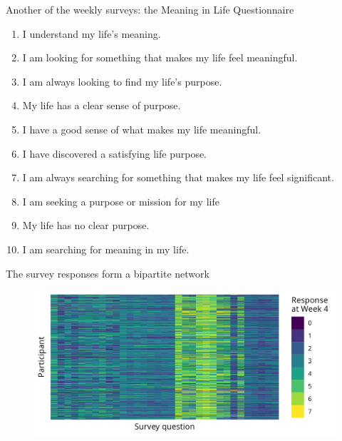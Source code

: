 \documentclass[aspectratio=169]{beamer}
\theoremstyle{remark}
\begin{document}
\begin{frame}{Another of the weekly surveys: the Meaning in Life Questionnaire}

    \begin{enumerate}
        \item I understand my life's meaning.
        \item I am looking for something that makes my life feel meaningful.
        \item I am always looking to find my life's purpose.
        \item My life has a clear sense of purpose.
        \item I have a good sense of what makes my life meaningful.
        \item I have discovered a satisfying life purpose.
        \item I am always searching for something that makes my life feel significant.
        \item I am seeking a purpose or mission for my life
        \item My life has no clear purpose.
        \item I am searching for meaning in my life.
    \end{enumerate}

    \footnotesize
\end{frame}

\begin{frame}{The survey responses form a bipartite network}
    \centering
    \begin{figure}
        \includegraphics{figures/week4-responses.png}
    \end{figure}
\end{frame}
\end{document}
